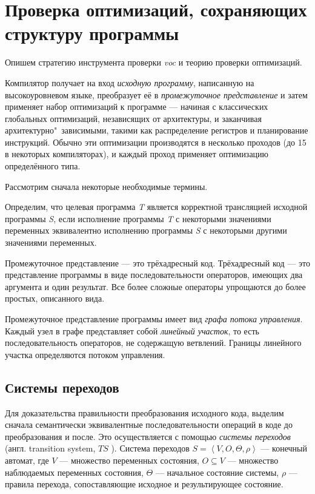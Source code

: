 \section{Проверка оптимизаций, сохраняющих структуру программы}

Опишем стратегию инструмента проверки \emph{voc} \cite{ZPFG02} и теорию проверки оптимизаций.

Компилятор получает на вход \emph{исходную программу}, написанную на высокоуровневом языке, преобразует её в \emph{промежуточное представление} и затем применяет набор оптимизаций к программе --- начиная с классических глобальных оптимизаций, независящих от архитектуры, и заканчивая архитектурно"~зависимыми, такими как распределение регистров и планирование инструкций. Обычно эти оптимизации производятся в несколько проходов (до 15 в некоторых компиляторах), и каждый проход применяет оптимизацию определённого типа.

Рассмотрим сначала некоторые необходимые термины.

Определим, что целевая программа \emph{T} является корректной трансляцией исходной программы \emph{S}, если исполнение программы \emph{T} с некоторыми значениями переменных эквивалентно исполнению программы \emph{S} с некоторыми другими значениями переменных.

Промежуточное представление --- это трёхадресный код. Трёхадресный код --- это представление программы в виде последовательности операторов, имеющих два аргумента и один результат. Все более сложные операторы упрощаются до более простых, описанного вида.

Промежуточное представление программы имеет вид \emph{графа потока управления}. Каждый узел в графе представляет собой \emph{линейный участок}, то есть последовательность операторов, не содержащую ветвлений. Границы линейного участка определяются потоком управления.

\subsection{Системы переходов}

Для доказательства правильности преобразования исходного кода, выделим сначала семантически эквивалентные последовательности операций в коде до преобразования и после. Это осуществляется с помощью \emph{системы переходов} (англ. transition system, $TS$ \cite{PSS98b}). Система переходов $S = \left\langle  V, O, \Theta, \rho \right\rangle $ --- конечный автомат, где $V$ --- множество переменных состояния, $O \subseteq V$ --- множество наблюдаемых переменных состояния, $\Theta$ --- начальное состояние системы, $\rho$ --- правила перехода, сопоставляющие исходное и результирующее состояние.

